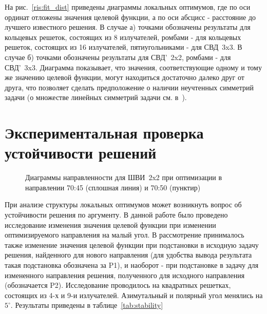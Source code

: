 На рис.~\ref{ris:fit_dist} приведены диаграммы локальных оптимумов, где по оси ординат отложены значения целевой функции, а по оси
абсцисс - расстояние до лучшего известного решения. В случае а) точками обозначены результаты для кольцевых решеток, состоящих из 8 излучателей, ромбами - для кольцевых решеток, состоящих из 16 излучателей, пятиугольниками - для СВД~3x3. В случае б) точками обозначены результаты для СВД'~2x2, ромбами - для СВД'~3x3. Диаграмма показывает, что значения, соответствующие одному и тому же значению целевой функции, могут находиться достаточно далеко друг от друга, что позволяет сделать предположение о наличии неучтенных симметрий задачи (о множестве линейных симметрий задачи см. в~\cite{yurkov:symmetry}).

\section{Экспериментальная проверка устойчивости решений}
\begin{figure}[h]
    \centering
    \vspace{0.7em}
    \caption{Диаграммы направленности для ШВИ~2x2 при оптимизации в направлении 70:45 (сплошная линия) и 70:50 (пунктир)}
    \label{ris:bve_comp}
\end{figure}
При анализе структуры локальных оптимумов может возникнуть вопрос об устойчивости решения по аргументу. В данной работе было проведено исследование изменения значения целевой функции при изменении оптимизируемого направления на малый угол. В рассмотрение принималось также изменение значения целевой функции при подстановки в исходную задачу решения, найденного для нового направления (для удобства вывода результата такая подстановка обозначена за P1), и наоборот - при подстановке в задачу для измененного направления решения, полученного для исходного направления (обозначается P2). Исследование проводилось на квадратных решетках, состоящих из 4-х и 9-и излучателей. Азимутальный и полярный угол менялись на $5^{\circ}$. Результаты приведены в таблице~\ref{tab:stability}
